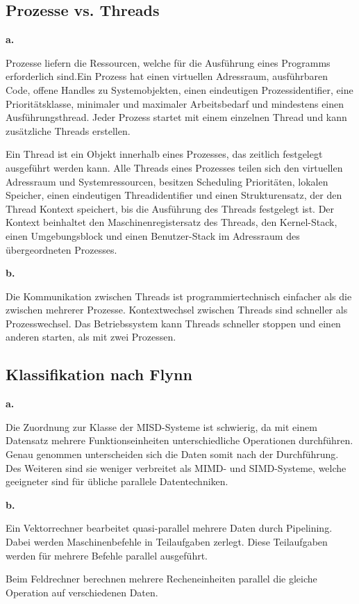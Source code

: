 \documentclass[12pt]{article}
\begin{document}
\subsection{Prozesse vs. Threads}

\noindent \textbf{a.}

Prozesse liefern die Ressourcen, welche für die Ausführung eines Programms erforderlich sind.Ein Prozess hat einen virtuellen Adressraum, ausführbaren Code, offene Handles zu Systemobjekten, einen eindeutigen Prozessidentifier, eine Prioritätsklasse, minimaler und maximaler Arbeitsbedarf und mindestens einen Ausführungsthread. Jeder Prozess startet mit einem einzelnen Thread und kann zusätzliche Threads erstellen.

Ein Thread ist ein Objekt innerhalb eines Prozesses, das zeitlich festgelegt ausgeführt werden kann. Alle Threads eines Prozesses teilen sich den virtuellen Adressraum und Systemressourcen, besitzen Scheduling Prioritäten, lokalen Speicher, einen eindeutigen Threadidentifier und einen Strukturensatz, der den Thread Kontext speichert, bis die Ausführung des Threads festgelegt ist. Der Kontext beinhaltet den Maschinenregistersatz des Threads, den Kernel-Stack, einen Umgebungsblock und einen Benutzer-Stack im Adressraum des übergeordneten Prozesses.

\noindent \textbf{b.}

Die Kommunikation zwischen Threads ist programmiertechnisch einfacher als die zwischen mehrerer Prozesse. Kontextwechsel zwischen Threads sind schneller als Prozesswechsel. Das Betriebssystem kann Threads schneller stoppen und einen anderen starten, als mit zwei Prozessen.

\subsection{Klassifikation nach Flynn}

\noindent \textbf{a.}

Die Zuordnung zur Klasse der MISD-Systeme ist schwierig, da mit einem Datensatz mehrere Funktionseinheiten unterschiedliche Operationen durchführen. Genau genommen unterscheiden sich die Daten somit nach der Durchführung. Des Weiteren sind sie weniger verbreitet als MIMD- und SIMD-Systeme, welche geeigneter sind für übliche parallele Datentechniken.

\noindent \textbf{b.}

Ein Vektorrechner bearbeitet quasi-parallel mehrere Daten durch Pipelining. Dabei werden Maschinenbefehle in Teilaufgaben zerlegt. Diese Teilaufgaben werden für mehrere Befehle parallel ausgeführt.

Beim Feldrechner berechnen mehrere Recheneinheiten parallel die gleiche Operation auf verschiedenen Daten.
\end{document}
